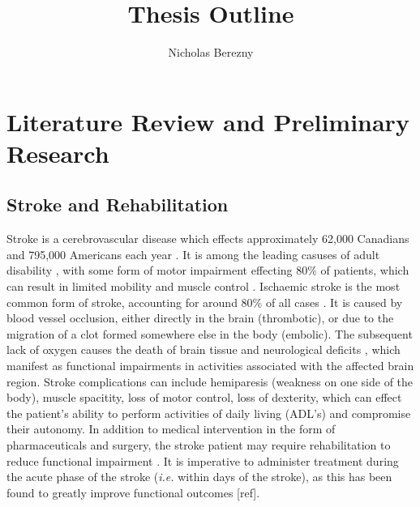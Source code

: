 \documentclass[12pt]{report}
\author{Nicholas Berezny}
\title{Thesis Outline}
\begin{document}
\maketitle
\newpage

\chapter{Literature Review and Preliminary Research}

\section{Stroke and Rehabilitation}

Stroke is a cerebrovascular disease which effects approximately 62,000 Canadians and 795,000 Americans each year \cite{Benjamin2018,Hebert2016}. It is among the leading casuses of adult disability \cite{Ewart2003}, with some form of motor impairment effecting 80\% of patients, which can result in limited mobility and muscle control \cite{Langhorne2009}. Ischaemic stroke is the most common form of stroke, accounting for around 80\% of all cases \cite{Rey2008}. It is caused by blood vessel occlusion, either directly in the brain (thrombotic), or due to the migration of a clot formed somewhere else in the body (embolic). The subsequent lack of oxygen causes the death of brain tissue and neurological deficits \cite{Prabhakaran2015}, which manifest as functional impairments in activities associated with the affected brain region. Stroke complications can include hemiparesis (weakness on one side of the body), muscle spacitity, loss of motor control, loss of dexterity, which can effect the patient's ability to perform activities of daily living (ADL's) and compromise their autonomy. In addition to medical intervention in the form of pharmaceuticals and surgery, the stroke patient may require rehabilitation to reduce functional impairment \cite{Stroke}. It is imperative to administer treatment during the acute phase of the stroke (\textit{i.e.} within days of the stroke), as this has been found to greatly improve functional outcomes [ref].

\end{document}
